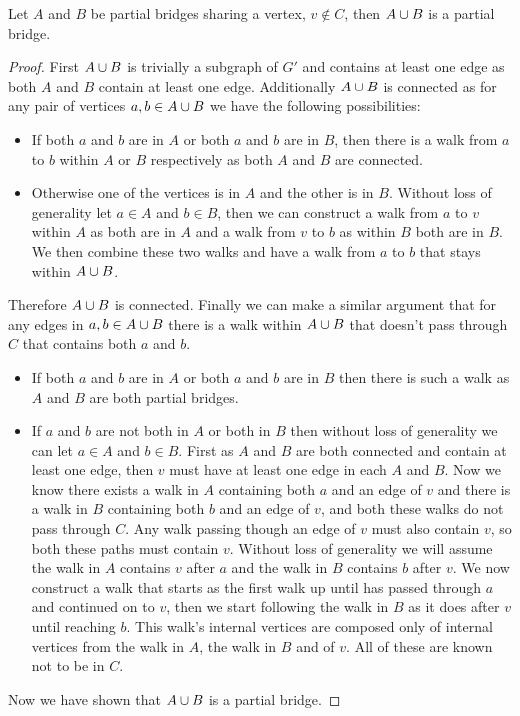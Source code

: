 \documentclass{article}
\begin{document}
\begin{lemma}\label{partialbridgeunion}
	Let $A$ and $B$ be partial bridges sharing a vertex, $v\not\in C$, then $A\cup B$ is a partial bridge.
\end{lemma}
\begin{proof}
	First $A\cup B$ is trivially a subgraph of $G'$ and contains at least one edge as both $A$ and $B$ contain at least one edge. Additionally $A\cup B$ is connected as for any pair of vertices $a,b \in A\cup B$ we have the following possibilities:
	\begin{itemize}
		\item If both $a$ and $b$ are in $A$ or both $a$ and $b$ are in $B$, then there is a walk from $a$ to $b$ within $A$ or $B$ respectively as both $A$ and $B$ are connected.
		\item Otherwise one of the vertices is in $A$ and the other is in $B$. Without loss of generality let $a\in A$ and $b\in B$, then we can construct a walk from $a$ to $v$ within $A$ as both are in $A$ and a walk from $v$ to $b$ as within $B$ both are in $B$. We then combine these two walks and have a walk from $a$ to $b$ that stays within $A\cup B$.
	\end{itemize}
	Therefore $A\cup B$ is connected. Finally we can make a similar argument that for any edges in $a,b\in A\cup B$ there is a walk within $A\cup B$ that doesn't pass through $C$ that contains both $a$ and $b$.
	\begin{itemize}
		\item If both $a$ and $b$ are in $A$ or both $a$ and $b$ are in $B$ then there is such a walk as $A$ and $B$ are both partial bridges.
		\item If $a$ and $b$ are not both in $A$ or both in $B$ then without loss of generality we can let $a\in A$ and $b \in B$. First as $A$ and $B$ are both connected and contain at least one edge, then $v$ must have at least one edge in each $A$ and $B$. Now we know there exists a walk in $A$ containing both $a$ and an edge of $v$ and there is a walk in $B$ containing both $b$ and an edge of $v$, and both these walks do not pass through $C$. Any walk passing though an edge of $v$ must also contain $v$, so both these paths must contain $v$. Without loss of generality we will assume the walk in $A$ contains $v$ after $a$ and the walk in $B$ contains $b$ after $v$. We now construct a walk that starts as the first walk up until has passed through $a$ and continued on to $v$, then we start following the walk in $B$ as it does after $v$ until reaching $b$. This walk's internal vertices are composed only of internal vertices from the walk in $A$, the walk in $B$ and of $v$. All of these are known not to be in $C$.
	\end{itemize}
	Now we have shown that $A\cup B$ is a partial bridge.
\end{proof}
\end{document}
